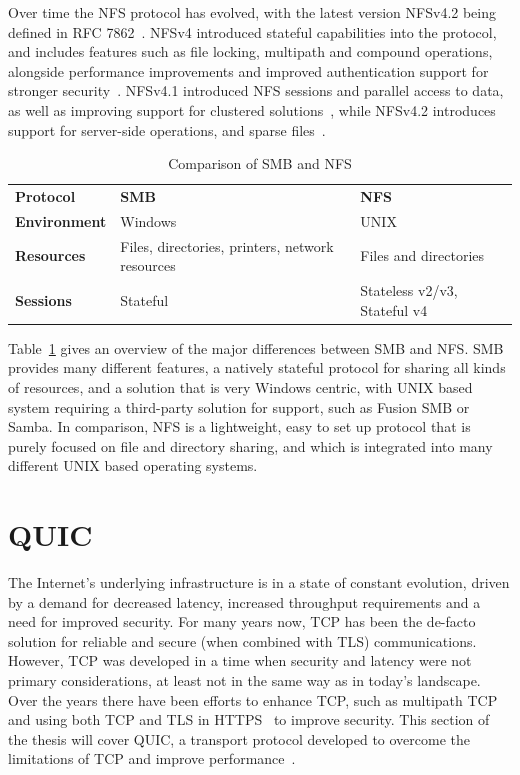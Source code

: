 \documentclass[english, 12pt, a4paper, elec, utf8, a-2b, online]{aaltothesis}
\begin{document}
Over time the NFS protocol has evolved, with the latest version NFSv4.2 being
defined in RFC 7862~\cite{rfc7862}. NFSv4 introduced stateful capabilities into the protocol, and
includes features such as file locking, multipath and compound operations, alongside performance
improvements and improved authentication support for stronger security~\cite{rfc7530}.
NFSv4.1 introduced NFS sessions and parallel access to data, as well as improving support
for clustered solutions~\cite{rfc8881}, while
NFSv4.2 introduces support for server-side operations, and sparse files~\cite{rfc7862}.

\begin{table}[h]
	\centering
	\caption{Comparison of SMB and NFS}
	\label{tab:smb_nfs}
	\begin{tabular}{lll}
	\textbf{Protocol} & \textbf{SMB} & \textbf{NFS} \\
	\textbf{Environment}    & Windows     & UNIX    \\
	\textbf{Resources} &  Files, directories, printers, network resources   & Files and directories     \\
	\textbf{Sessions}  & Stateful  & Stateless v2/v3, Stateful v4    \\
	\end{tabular}
\end{table}

Table~\ref{tab:smb_nfs} gives an overview of the major differences between SMB and
NFS. SMB provides many different features, a natively stateful protocol for sharing
all kinds of resources, and a solution that is very Windows centric, with UNIX based
system requiring a third-party solution for support, such as Fusion SMB or
Samba. In comparison, NFS is a lightweight, easy to set up protocol that is purely
focused on file and directory sharing, and which is integrated into many
different UNIX based operating systems.
\clearpage

\section{QUIC}
\label{sec:quic}
The Internet's underlying infrastructure is in a state of constant evolution,
driven by a demand for decreased latency, increased throughput requirements and
a need for improved security. For many years now, TCP has been the de-facto
solution for reliable and secure (when combined with TLS) communications. However,
TCP was developed in a time when security and latency were not primary considerations,
at least not in the same way as in today's landscape. Over the years there have
been efforts to enhance TCP, such as multipath TCP~\cite{rfc8684} and using both
TCP and TLS in HTTPS~\cite{rfc2818} to improve security. This section of the thesis
will cover QUIC, a transport protocol developed to overcome the limitations of TCP
and improve performance~\cite{quic_transport_protocol_design}.
\end{document}
